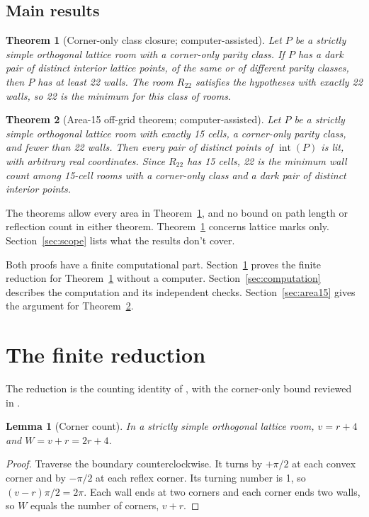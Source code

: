 \documentclass[11pt]{article}
\newtheorem{theorem}{Theorem}
\newtheorem{lemma}{Lemma}
\theoremstyle{definition}
\theoremstyle{remark}
\newcommand{\interior}{\operatorname{int}}
\begin{document}
\subsection{Main results}
\begin{theorem}[Corner-only class closure; computer-assisted]\label{thm:closure}
Let $P$ be a strictly simple orthogonal lattice room with a corner-only
parity class. If $P$ has a dark pair of distinct interior lattice points,
of the same or of different parity classes, then $P$ has at least 22
walls. The room $R_{22}$ satisfies the hypotheses with exactly 22 walls,
so 22 is the minimum for this class of rooms.
\end{theorem}

\begin{theorem}[Area-15 off-grid theorem; computer-assisted]\label{thm:area15}
Let $P$ be a strictly simple orthogonal lattice room with exactly 15 cells,
a corner-only parity class, and fewer than 22 walls. Then every pair of
distinct points of $\interior(P)$ is lit, with arbitrary real coordinates.
Since $R_{22}$ has 15 cells, 22 is the minimum wall count among 15-cell
rooms with a corner-only class and a dark pair of distinct interior points.
\end{theorem}

The theorems allow every area in Theorem~\ref{thm:closure}, and no bound on
path length or reflection count in either theorem. Theorem~\ref{thm:closure}
concerns lattice marks only. Section~\ref{sec:scope} lists what the results
don't cover.

Both proofs have a finite computational part. Section~\ref{sec:reduction}
proves the finite reduction for Theorem~\ref{thm:closure} without a
computer. Section~\ref{sec:computation} describes the computation and its
independent checks. Section~\ref{sec:area15} gives the argument for
Theorem~\ref{thm:area15}.

\section{The finite reduction}\label{sec:reduction}
The reduction is the counting identity of \cite[\S1]{d68}, with the
corner-only bound reviewed in \cite{d97}.

\begin{lemma}[Corner count]\label{lem:corners}
In a strictly simple orthogonal lattice room, $v=r+4$ and $W=v+r=2r+4$.
\end{lemma}
\begin{proof}
Traverse the boundary counterclockwise. It turns by $+\pi/2$ at each convex
corner and by $-\pi/2$ at each reflex corner. Its turning number is 1, so
$(v-r)\pi/2=2\pi$. Each wall ends at two corners and each corner ends two
walls, so $W$ equals the number of corners, $v+r$.
\end{proof}
\end{document}
